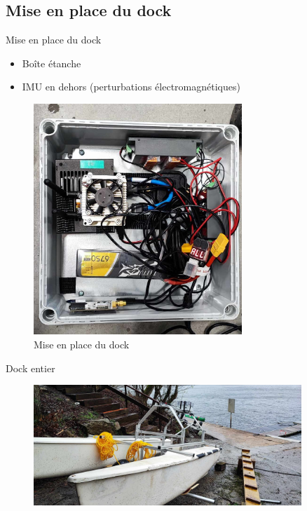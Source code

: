 \documentclass[pdftex,beamer,aspectratio=169]{beamer}
\theoremstyle{definition}
\theoremstyle{example}
\theoremstyle{plain}
\begin{document}
\subsection{Mise en place du dock}

\begin{frame}[fragile]{Mise en place du dock}
  \begin{minipage}{0.5\textwidth}
    \begin{itemize}
      \item Boîte étanche
      \item IMU en dehors (perturbations électromagnétiques)
    \end{itemize}
  \end{minipage}
  \begin{minipage}{0.49\textwidth}
    \begin{figure}[H]
      \centering
      \includegraphics[width=0.7\textwidth]{dock_box_inside.jpg}
      \caption{Mise en place du dock}
    \end{figure}
  \end{minipage}
\end{frame}

\begin{frame}[fragile]{Dock entier}
  \begin{figure}
    \centering
    \includegraphics[width=0.9\textwidth]{dock.jpg}
  \end{figure}
\end{frame}
\end{document}
